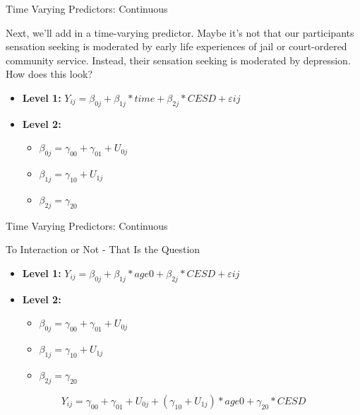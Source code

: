 \begin{frame}{Time Varying Predictors: Continuous}

Next, we'll add in a time-varying predictor. Maybe it's not that our
participants sensation seeking is moderated by early life experiences of
jail or court-ordered community service. Instead, their sensation
seeking is moderated by depression.\\
How does this look?

\begin{itemize}
  \item \textbf{Level 1:} $Y_{ij} = \beta_{0j} + \beta_{1j}*time + \beta_{2j}*CESD + \varepsilon{ij}$
  \item \textbf{Level 2:} 
    \begin{itemize} 
      \item $\beta_{0j} = \gamma_{00} + \gamma_{01} + U_{0j}$
      \item $\beta_{1j} = \gamma_{10} + U_{1j}$
      \item $\beta_{2j} = \gamma_{20}$
    \end{itemize}
\end{itemize}

\end{frame}

\begin{frame}{Time Varying Predictors: Continuous}

\begin{block}{To Interaction or Not - That Is the Question}

\begin{itemize}
  \item \textbf{Level 1:} $Y_{ij} = \beta_{0j} + \beta_{1j}*age0 + \beta_{2j}*CESD + \varepsilon{ij}$
  \item \textbf{Level 2:} 
    \begin{itemize} 
      \item $\beta_{0j} = \gamma_{00} + \gamma_{01} + U_{0j}$
      \item $\beta_{1j} = \gamma_{10} + U_{1j}$
      \item $\beta_{2j} = \gamma_{20}$
    \end{itemize}
\end{itemize}

\[Y_{ij} =  \gamma_{00} + \gamma_{01} + U_{0j} + (\gamma_{10} + U_{1j})*age0 + \gamma_{20}*CESD\]

\end{block}

\end{frame}

